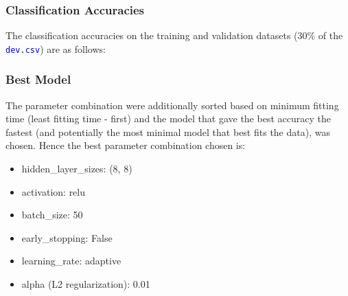 \documentclass[11pt,a4paper]{article}
\def\colortt#1{\textcolor{blue}{\texttt{#1}}}
\begin{document}
\subsubsection{Classification Accuracies}
The classification accuracies on the training and validation datasets (30\% of the \colortt{dev.csv}) are as follows:


\subsubsection{Best Model}
The parameter combination were additionally sorted based on minimum fitting time (least fitting time - first) and the model that gave the best accuracy the fastest (and potentially the most minimal model that best fits the data), was chosen. Hence the best parameter combination chosen is:
\begin{itemize}
    \itemsep0em
    \item hidden\_layer\_sizes: (8, 8)
    \item activation: relu
    \item batch\_size: 50
    \item early\_stopping: False
    \item learning\_rate: adaptive
    \item alpha (L2 regularization): 0.01
\end{itemize}
\end{document}
